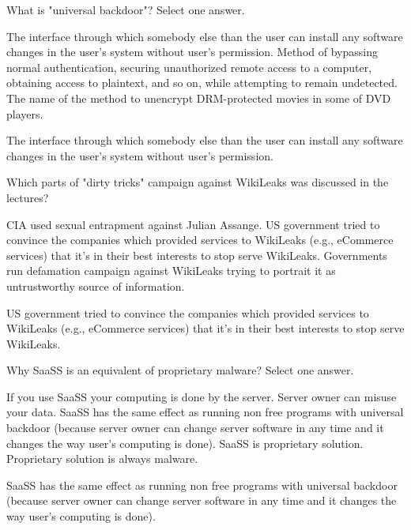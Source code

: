 \begin{question}[type=exam]
What is "universal backdoor"? Select one answer.
\begin{itemize}
\chk The interface through which somebody else than the user can install any software changes in the user's system without user's permission.
\chk Method of bypassing normal authentication, securing unauthorized remote access to a computer, obtaining access to plaintext, and so on, while attempting to remain undetected.
\chk The name of the method to unencrypt DRM-protected movies in some of DVD players.
\end{itemize}
\end{question}
\begin{solution}
The interface through which somebody else than the user can install any software changes in the user's system without user's permission.
\end{solution}

\begin{question}[type=exam]
Which parts of "dirty tricks" campaign against WikiLeaks was discussed in the lectures?
\begin{itemize}
\chk CIA used sexual entrapment against Julian Assange.
\chk US government tried to convince the companies which provided services to WikiLeaks (e.g., eCommerce services) that it's in their best interests to stop serve WikiLeaks.
\chk Governments run defamation campaign against WikiLeaks trying to portrait it as untrustworthy source of information.
\end{itemize}
\end{question}
\begin{solution}
US government tried to convince the companies which provided services to WikiLeaks (e.g., eCommerce services) that it's in their best interests to stop serve WikiLeaks.
\end{solution}

\begin{question}[type=exam]
Why SaaSS is an equivalent of proprietary malware? Select one answer.
\begin{itemize}
\chk If you use SaaSS your computing is done by the server. Server owner can misuse your data.
\chk SaaSS has the same effect as running non free programs with universal backdoor (because server owner can change server software in any time and it changes the way user's computing is done).
\chk SaaSS is proprietary solution. Proprietary solution is always malware.
\end{itemize}
\end{question}
\begin{solution}
SaaSS has the same effect as running non free programs with universal backdoor (because server owner can change server software in any time and it changes the way user's computing is done).
\end{solution}



